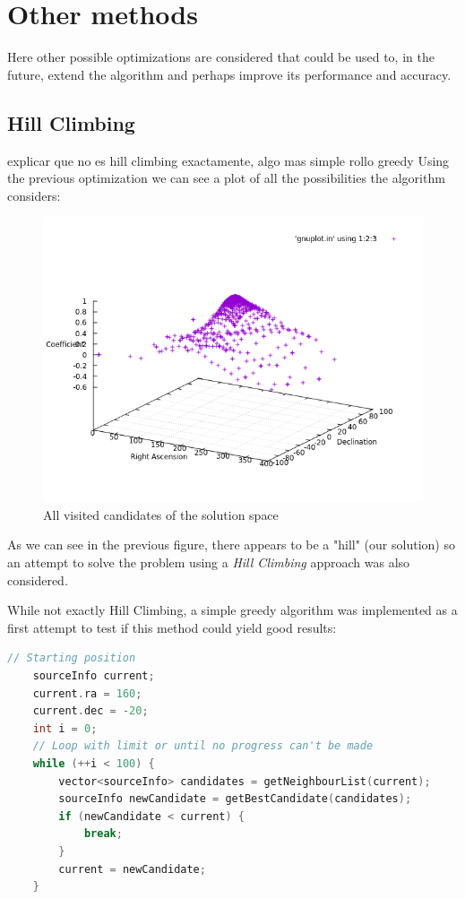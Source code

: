 \chapter{Other methods}

Here other possible optimizations are considered that could be used to, in the future, extend the algorithm and perhaps improve its performance and accuracy.

\section{Hill Climbing}

explicar que no es hill climbing exactamente, algo mas simple rollo greedy 
Using the previous optimization we can see a plot of all the possibilities the algorithm considers:

\begin{figure}[!htb]
	\begin{centering}
		\includegraphics[width=0.5\linewidth]{images/ch6/hillClimbing/resultsAll.png}
		\caption{All visited candidates of the solution space}
		\label{fig:solutionSpace}
	\end{centering}
\end{figure}

As we can see in the previous figure, there appears to be a "hill" (our solution) so an attempt to solve the problem using a \textit{Hill Climbing} approach was also considered.

While not exactly Hill Climbing, a simple greedy algorithm was implemented as a first attempt to test if this method could yield good results:

\begin{minipage}{\linewidth}
	\begin{lstlisting}[language=c, caption=Hill Climbing]
	// Starting position
	sourceInfo current;
	current.ra = 160;
	current.dec = -20;
	int i = 0;
	// Loop with limit or until no progress can't be made
	while (++i < 100) {
		vector<sourceInfo> candidates = getNeighbourList(current);
		sourceInfo newCandidate = getBestCandidate(candidates);
		if (newCandidate < current) {
			break;
		}
		current = newCandidate;
	}
	\end{lstlisting}
\end{minipage}

